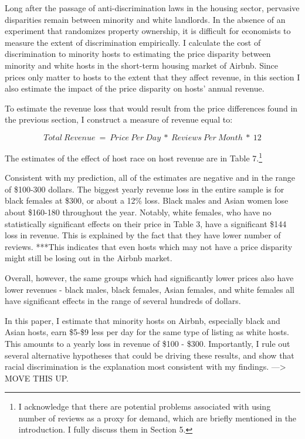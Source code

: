 
Long after the passage of anti-discrimination laws in the housing sector, pervasive disparities remain between minority and white landlords. In the absence of an experiment that randomizes property ownership, it is difficult for economists to measure the extent of discrimination empirically. I calculate the cost of discrimination to minority hosts to estimating the price disparity between minority and white hosts in the short-term housing market of Airbnb. Since prices only matter to hosts to the extent that they affect revenue, in this section I also estimate the impact of the price disparity on hosts' annual revenue.

To estimate the revenue loss that would result from the price differences found in the previous section, I construct a measure of revenue equal to: 

\[Total \: Revenue \ = \ Price \: Per \: Day \ * \ Reviews \: Per \: Month \ * \ 12\] 

The estimates of the effect of host race on host revenue are in Table 7.\footnote{I acknowledge that there are potential problems associated with using number of reviews as a proxy for demand, which are briefly mentioned in the introduction. I fully discuss them in Section 5.} 

Consistent with my prediction, all of the estimates are negative and in the range of \$100-300 dollars. The biggest yearly revenue loss in the entire sample is for black females at \$300, or about a 12\% loss. Black males and Asian women lose about \$160-180 throughout the year. Notably, white females, who have no statistically significant effects on their price in Table 3, have a significant \$144 loss in revenue. This is explained by the fact that they have lower number of reviews. ***This indicates that even hosts which may not have a price disparity might still be losing out in the Airbnb market. 

Overall, however, the same groups which had significantly lower prices also have lower revenues - black males, black females, Asian females, and white females all have significant effects in the range of several hundreds of dollars. 

In this paper, I estimate that minority hosts on Airbnb, especially black and Asian hosts, earn \$5-\$9 less per day for the same type of listing as white hosts. This amounts to a yearly loss in revenue of \$100 - \$300. Importantly, I rule out several alternative hypotheses that could be driving these results, and show that racial discrimination is the explanation most consistent with my findings. ---> MOVE THIS UP. 

